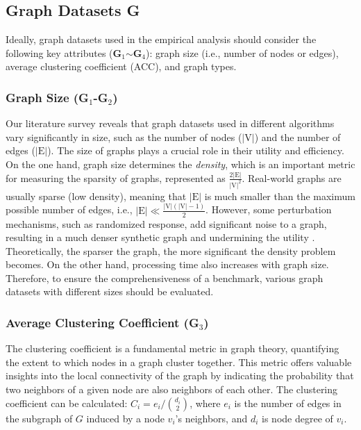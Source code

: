 \documentclass[conference]{IEEEtran}
\theoremstyle{plain}
\begin{document}
\subsection{Graph Datasets \textbf{G}}
Ideally, graph datasets used in the empirical analysis should consider the following key attributes (\textbf{G$_1$}$\sim$\textbf{G$_4$}): graph size (i.e., number of nodes or edges), average clustering coefficient (ACC), and graph types.

\subsubsection{Graph Size (\textbf{G$_1$}-\textbf{G$_2$})}
Our literature survey reveals that graph datasets used in different algorithms vary significantly in size, such as the number of nodes ($|\text{V}|$) and the number of edges ($|\text{E}|$). 
The size of graphs plays a crucial role in their utility and efficiency.
On the one hand, graph size determines the \textit{density}, which is an important metric for measuring the sparsity of graphs, represented as $\frac{2|\text{E}|}{{|\text{V}|}^2}$. 
Real-world graphs are usually sparse (low density), meaning that $|\text{E}|$ is much smaller than the maximum possible number of edges, i.e., $|\text{E}| \ll \frac{|\text{V}|(|\text{V}|-1)}{2}$. 
However, some perturbation mechanisms, such as randomized response, add significant noise to a graph, resulting in a much denser synthetic graph and undermining the utility \cite{ye2020lf, qin2017generating}. 
Theoretically, the sparser the graph, the more significant the density problem becomes.
On the other hand, processing time also increases with graph size. 
Therefore, to ensure the comprehensiveness of a benchmark, various graph datasets with different sizes should be evaluated.

\subsubsection{Average Clustering Coefficient (\textbf{G$_3$})}
The clustering coefficient \cite{holland1971transitivity} is a fundamental metric in graph theory, quantifying the extent to which nodes in a graph cluster together. 
This metric offers valuable insights into the local connectivity of the graph by indicating the probability that two neighbors of a given node are also neighbors of each other.
The clustering coefficient can be calculated: $C_i=e_i/\binom{{d_i}}{2}$, where $e_i$ is the number of edges in the subgraph of $G$ induced by a node $v_i$'s neighbors, and $d_i$ is node degree of $v_i$.
\end{document}
